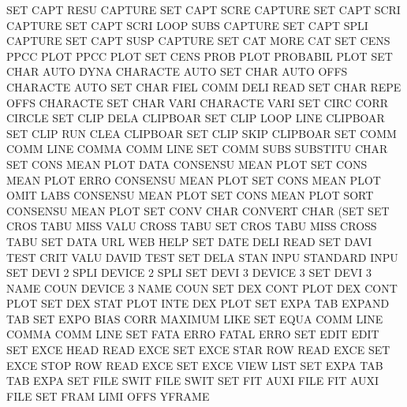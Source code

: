 SET      CAPT RESU                      CAPTURE
SET      CAPT SCRE                      CAPTURE
SET      CAPT SCRI                      CAPTURE
SET      CAPT SCRI LOOP SUBS            CAPTURE
SET      CAPT SPLI                      CAPTURE
SET      CAPT SUSP                      CAPTURE
SET      CAT  MORE                      CAT
SET      CENS PPCC PLOT                 PPCC     PLOT
SET      CENS PROB PLOT                 PROBABIL PLOT
SET      CHAR AUTO DYNA                 CHARACTE AUTO
SET      CHAR AUTO OFFS                 CHARACTE AUTO
SET      CHAR FIEL COMM DELI            READ
SET      CHAR REPE OFFS                 CHARACTE
SET      CHAR VARI                      CHARACTE VARI
SET      CIRC CORR                      CIRCLE
SET      CLIP DELA                      CLIPBOAR
SET      CLIP LOOP LINE                 CLIPBOAR
SET      CLIP RUN  CLEA                 CLIPBOAR
SET      CLIP SKIP                      CLIPBOAR
SET      COMM COMM LINE                 COMMA    COMM LINE
SET      COMM SUBS                      SUBSTITU CHAR
SET      CONS MEAN PLOT DATA            CONSENSU MEAN PLOT
SET      CONS MEAN PLOT ERRO            CONSENSU MEAN PLOT
SET      CONS MEAN PLOT OMIT LABS       CONSENSU MEAN PLOT
SET      CONS MEAN PLOT SORT            CONSENSU MEAN PLOT
SET      CONV CHAR                      CONVERT  CHAR (SET
SET      CROS TABU MISS VALU            CROSS    TABU
SET      CROS TABU MISS                 CROSS    TABU
SET      DATA URL                       WEB      HELP
SET      DATE DELI                      READ
SET      DAVI TEST CRIT VALU            DAVID    TEST
SET      DELA STAN INPU                 STANDARD INPU
SET      DEVI 2    SPLI                 DEVICE   2    SPLI 
SET      DEVI 3                         DEVICE   3
SET      DEVI 3    NAME COUN            DEVICE   3    NAME COUN
SET      DEX  CONT PLOT                 DEX      CONT PLOT
SET      DEX  STAT PLOT INTE            DEX      PLOT
SET      EXPA TAB                       EXPAND   TAB
SET      EXPO BIAS CORR                 MAXIMUM  LIKE
SET      EQUA COMM LINE                 COMMA    COMM LINE
SET      FATA ERRO                      FATAL    ERRO
SET      EDIT                           EDIT
SET      EXCE HEAD                      READ     EXCE
SET      EXCE STAR ROW                  READ     EXCE
SET      EXCE STOP ROW                  READ     EXCE
SET      EXCE VIEW                      LIST
SET      EXPA TAB                       TAB      EXPA
SET      FILE SWIT                      FILE     SWIT
SET      FIT  AUXI FILE                 FIT      AUXI FILE
SET      FRAM LIMI OFFS                 YFRAME
